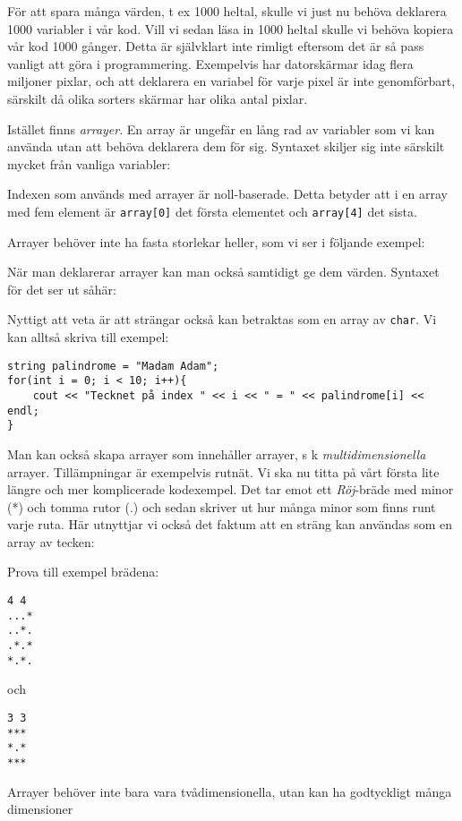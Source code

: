 För att spara många värden, t ex 1000 heltal, skulle vi just nu behöva deklarera 1000 variabler i vår kod. Vill vi sedan läsa in 1000 heltal skulle vi behöva kopiera vår kod 1000 gånger. Detta är självklart inte rimligt eftersom det är så pass vanligt att göra i programmering.  Exempelvis har datorskärmar idag flera miljoner pixlar, och att deklarera en variabel för varje pixel är inte genomförbart, särskilt då olika sorters skärmar har olika antal pixlar. 

Istället finns \emph{arrayer}. En array är ungefär en lång rad av variabler som vi kan använda utan att behöva deklarera dem för sig. Syntaxet skiljer sig inte särskilt mycket från vanliga variabler:



Indexen som används med arrayer är noll-baserade. Detta betyder att i en array med fem element är \texttt{array[0]} det första elementet och \texttt{array[4]} det sista.

Arrayer behöver inte ha fasta storlekar heller, som vi ser i följande exempel:



När man deklarerar arrayer kan man också samtidigt ge dem värden. Syntaxet för det ser ut såhär:



Nyttigt att veta är att strängar också kan betraktas som en array av \texttt{char}. Vi kan alltså skriva till exempel:

\begin{lstlisting}
string palindrome = "Madam Adam";
for(int i = 0; i < 10; i++){
	cout << "Tecknet på index " << i << " = " << palindrome[i] << endl;
}
\end{lstlisting}

Man kan också skapa arrayer som innehåller arrayer, s k \emph{multidimensionella} arrayer. Tillämpningar är exempelvis rutnät. Vi ska nu titta på vårt första lite längre och mer komplicerade kodexempel. Det tar emot ett \emph{Röj}-bräde med minor (*) och tomma rutor (.) och sedan skriver ut hur många minor som finns runt varje ruta. Här utnyttjar vi också det faktum att en sträng kan användas som en array av tecken:



Prova till exempel brädena:

\begin{verbatim}
4 4
...*
..*.
.*.*
*.*.
\end{verbatim}

och

\begin{verbatim}
3 3
***
*.*
***
\end{verbatim}

Arrayer behöver inte bara vara tvådimensionella, utan kan ha godtyckligt många dimensioner